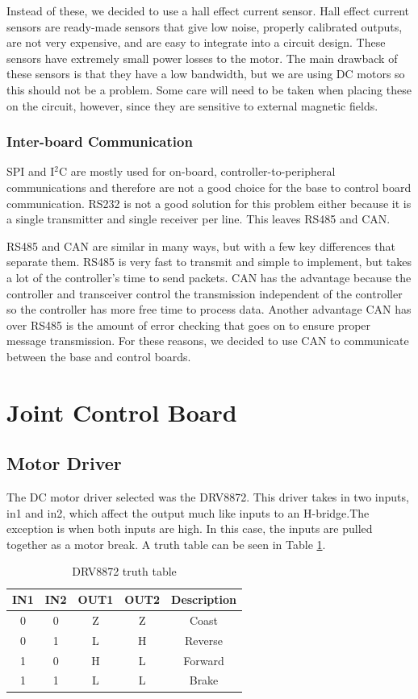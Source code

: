 \noindent Instead of these, we decided to use a hall effect current sensor. Hall effect current sensors are ready-made sensors that give low noise, properly calibrated outputs, are not very expensive, and are easy to integrate into a circuit design. These sensors have extremely small power losses to the motor. The main drawback of these sensors is that they have a low bandwidth, but we are using DC motors so this should not be a problem. Some care will need to be taken when placing these on the circuit, however, since they are sensitive to external magnetic fields.

\subsubsection{Inter-board Communication}
SPI and I$^2$C are mostly used for on-board, controller-to-peripheral communications and therefore are not a good choice for the base to control board communication. RS232 is not a good solution for this problem either because it is a single transmitter and single receiver per line. This leaves RS485 and CAN.

\noindent RS485 and CAN are similar in many ways, but with a few key differences that separate them. RS485 is very fast to transmit and simple to implement, but takes a lot of the controller's time to send packets. CAN has the advantage because the controller and transceiver control the transmission independent of the controller so the controller has more free time to process data. Another advantage CAN has over RS485 is the amount of error checking that goes on to ensure proper message transmission. For these reasons, we decided to use CAN to communicate between the base and control boards.

\section{Joint Control Board}
\subsection{Motor Driver}
The DC motor driver selected was the DRV8872. This driver takes in two inputs, in1 and in2, which affect the output much like inputs to an H-bridge.The exception is when both inputs are high. In this case, the inputs are pulled together as a motor break. A truth table can be seen in Table \ref{tbl:drv8872-truth6}.

\begin{table}[H]
	\centering
	\caption{DRV8872 truth table}
	\begin{tabular}{| c | c | c | c| c |}
		\hline
		IN1 & IN2 & OUT1 & OUT2 & Description \\
		\hline
		0 & 0 & Z & Z & Coast \\
		0 & 1 & L & H & Reverse \\
		1 & 0 & H & L & Forward \\
		1 & 1 & L & L & Brake \\
		\hline
	\end{tabular}
	\label{tbl:drv8872-truth6}
\end{table}

